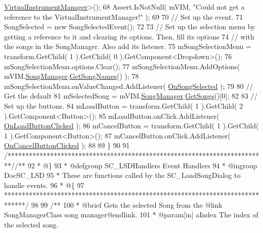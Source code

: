 \begin{DoxyCodeInclude}
      \hyperlink{class_virtual_instrument_manager}{VirtualInstrumentManager}>();
68         Assert.IsNotNull( mVIM, \textcolor{stringliteral}{"Could not get a reference to the VirtualInstrumentManager!"} );
69 
70         \textcolor{comment}{// Set up the event.}
71         SongSelected = \textcolor{keyword}{new} SongSelectedEvent();
72 
73         \textcolor{comment}{// Set up the selection menu by getting a reference to it and clearing its options. Then, fill its
       options}
74         \textcolor{comment}{// with the songs in the SongManager. Also add its listener.}
75         mSongSelectionMenu = transform.GetChild( 1 ).GetChild( 0 ).GetComponent<Dropdown>();
76         mSongSelectionMenu.options.Clear();
77         mSongSelectionMenu.AddOptions( mVIM.\hyperlink{group___v_i_m_pub_ga33dae94932c10c66db76a0eebec76b01}{SongManager}.\hyperlink{group___s_m_pub_func_ga2a9455a763e35cfb6b242a82f7d797ae}{GetSongNames}() );
78         mSongSelectionMenu.onValueChanged.AddListener( \hyperlink{group___s_c___l_s_d_handlers_gacbe31698637339188fd50ba1a6723eab}{OnSongSelected} );
79 
80         \textcolor{comment}{// Get the default }
81         mSelectedSong = mVIM.\hyperlink{group___v_i_m_pub_ga33dae94932c10c66db76a0eebec76b01}{SongManager}.\hyperlink{group___s_m_pub_func_ga3bf6a6d42a7c5e94cc85ba10eb9e6edb}{GetSongs}()[0];
82 
83         \textcolor{comment}{// Set up the buttons.}
84         mLoadButton = transform.GetChild( 1 ).GetChild( 2 ).GetComponent<Button>();
85         mLoadButton.onClick.AddListener( \hyperlink{group___s_c___l_s_d_handlers_gad6ab852f2ac019395482e8c836061639}{OnLoadButtonClicked} );
86         mCancelButton = transform.GetChild( 1 ).GetChild( 1 ).GetComponent<Button>();
87         mCancelButton.onClick.AddListener( \hyperlink{group___s_c___l_s_d_handlers_gae393a24bbdd4fa1d2b45fa4199fb453a}{OnCancelButtonClicked} );
88 
89     \}
90 
91     \textcolor{comment}{/*************************************************************************/}\textcolor{comment}{/** }
92 \textcolor{comment}{    * @\}}
93 \textcolor{comment}{    * @defgroup SC\_LSDHandlers Event Handlers}
94 \textcolor{comment}{    * @ingroup DocSC\_LSD}
95 \textcolor{comment}{    * These are functions called by the SC\_LoadSongDialog to handle events.}
96 \textcolor{comment}{    * @\{}
97 \textcolor{comment}{    ******************************************************************************/}
98 \textcolor{comment}{}
99 \textcolor{comment}{    /**}
100 \textcolor{comment}{     * @brief Gets the selected Song from the @link SongManagerClass song manager@endlink.}
101 \textcolor{comment}{     * @param[in] aIndex The index of the selected song.}

\end{DoxyCodeInclude}
